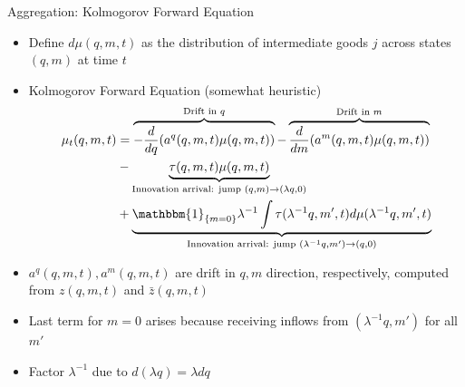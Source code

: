\documentclass[english,usenames,dvipsnames]{beamer}
\begin{document}
\begin{frame}{Aggregation: Kolmogorov Forward Equation}
\begin{itemize}
	\small
	\item Define $d\mu(q,m,t)$ as the distribution of intermediate goods $j$ across states $(q,m)$ at time $t$
	\item Kolmogorov Forward Equation (somewhat heuristic) 
	\begin{align*}
	\mu_t(q,m,t) &= \overbrace{-\frac{d}{dq} (a^q(q,m,t) \mu(q,m,t))}^{\text{Drift in $q$}} - \overbrace{\frac{d}{dm} (a^m(q,m,t) \mu(q,m,t))}^{\text{Drift in $m$}} \\ 
				 & - \underbrace{\tau(q,m,t)\mu(q,m,t)}_{\text{Innovation arrival: jump } (q,m) \to (\lambda q,0)} \\
				 & + \underbrace{\mathbbm{1}_{\{m = 0 \}}\lambda^{-1} \int \tau(\lambda^{-1}q,m',t) d\mu(\lambda^{-1}q,m',t)}_{\text{Innovation arrival: jump } (\lambda^{-1}q,m') \to (q,0)}
	\end{align*}
	\item $a^q(q,m,t),a^m(q,m,t)$ are drift in $q,m$ direction, respectively, computed from $z(q,m,t)$ and $\bar{z}(q,m,t)$
	\item Last term for $m = 0$ arises because receiving inflows from $(\lambda^{-1}q,m')$ for all $m'$ 
	\item Factor $\lambda^{-1}$ due to $d(\lambda q) = \lambda dq$
\end{itemize}
\end{frame}
\end{document}
